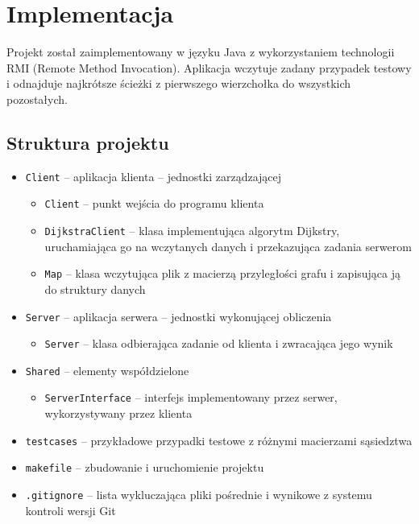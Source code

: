 \documentclass{article}
\begin{document}
\clearpage
\section{Implementacja}

Projekt został zaimplementowany w języku Java z wykorzystaniem technologii RMI (Remote Method Invocation). Aplikacja wczytuje zadany przypadek testowy i odnajduje najkrótsze ścieżki z pierwszego wierzchołka do wszystkich pozostałych.

\subsection{Struktura projektu}

\begin{itemize}

	\item \texttt{Client} -- aplikacja klienta -- jednostki zarządzającej
	\begin{itemize} 
		\item \texttt{Client} -- punkt wejścia do programu klienta
		\item \texttt{DijkstraClient} -- klasa implementująca algorytm Dijkstry, uruchamiająca go na wczytanych danych i przekazująca zadania serwerom
		\item \texttt{Map} -- klasa wczytująca plik z macierzą przyległości grafu i zapisująca ją do struktury danych
	\end{itemize}
	\item \texttt{Server} -- aplikacja serwera -- jednostki wykonującej obliczenia
	\begin{itemize} 
		\item \texttt{Server} -- klasa odbierająca zadanie od klienta i zwracająca jego wynik
	\end{itemize}
	\item \texttt{Shared} -- elementy współdzielone
	\begin{itemize} 
		\item \texttt{ServerInterface} -- interfejs implementowany przez serwer, wykorzystywany przez klienta
	\end{itemize}
	\item \texttt{testcases} -- przykładowe przypadki testowe z różnymi macierzami sąsiedztwa
	\item \texttt{makefile} -- zbudowanie i uruchomienie projektu 
	\item \texttt{.gitignore} -- lista wykluczająca pliki pośrednie i wynikowe z systemu kontroli wersji Git
\end{itemize}
\end{document}
